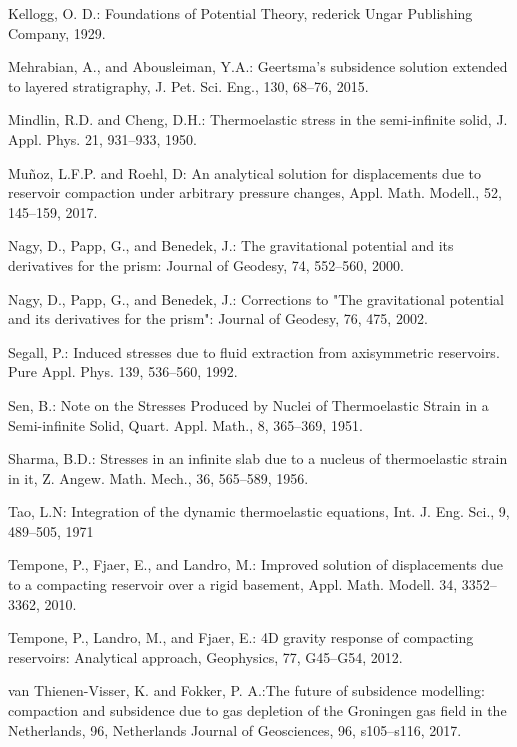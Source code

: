 \documentclass[journal abbreviation, manuscript]{copernicus}
\begin{document}
\begin{thebibliography}{}
Kellogg, O. D.: Foundations of Potential Theory, rederick Ungar Publishing Company, 1929.

Mehrabian, A., and  Abousleiman,  Y.A.: Geertsma’s subsidence solution extended to layered stratigraphy, J. Pet. Sci. Eng., 130, 68–76, 2015.

Mindlin, R.D.  and   Cheng, D.H.: Thermoelastic stress in the semi-infinite solid, J. Appl. Phys. 21, 931–933, 1950.

Muñoz, L.F.P. and Roehl, D: An analytical solution for displacements due to reservoir
compaction under arbitrary pressure changes, Appl. Math. Modell., 52, 145–159, 2017.


Nagy, D.,  Papp, G., and  Benedek, J.: The gravitational potential and its
derivatives for the prism: Journal of Geodesy, 74, 552–560, 2000.


Nagy, D.,  Papp, G., and  Benedek, J.: Corrections to "The gravitational potential and its
derivatives for the prism": Journal of Geodesy, 76, 475, 2002.

Segall, P.: Induced stresses due to fluid extraction from
axisymmetric reservoirs. Pure Appl. Phys. 139, 536–560, 1992.

Sen, B.: Note on the Stresses Produced by Nuclei of Thermoelastic Strain
in a Semi-infinite Solid, Quart. Appl. Math., 8, 365–369, 1951. 

Sharma, B.D.: Stresses in an infinite slab due to a nucleus of thermoelastic strain in it, Z. Angew. Math. Mech., 36, 565–589, 1956. 

Tao, L.N: Integration of the dynamic thermoelastic equations, 
Int. J. Eng. Sci., 9, 489–505, 1971

Tempone, P.,  Fjaer, E., and  Landro, M.: Improved solution of displacements due to a compacting reservoir over a rigid basement, Appl. Math. Modell. 34, 3352–3362, 2010.

Tempone, P.,  Landro, M., and Fjaer, E.: 4D gravity response of compacting reservoirs: Analytical approach, Geophysics, 77, G45–G54, 2012.


van Thienen-Visser, K. and Fokker, P. A.:The future of subsidence modelling: compaction and subsidence due to gas depletion of the Groningen gas field in the Netherlands, 96, Netherlands Journal of Geosciences, 96, s105–s116, 2017.

\end{thebibliography}
\end{document}
